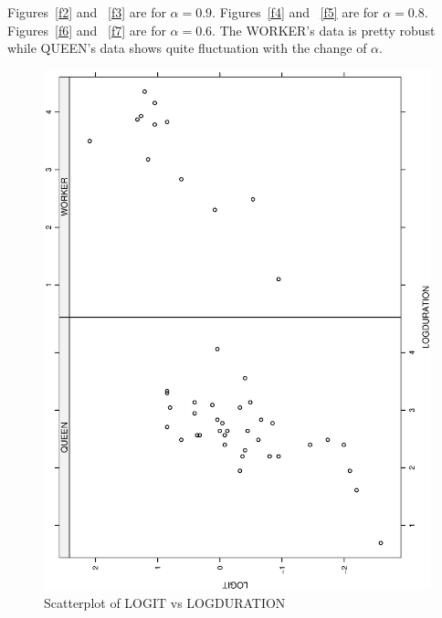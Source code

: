\documentclass[a4paper,10pt]{article}
\begin{document}
Figures~\ref{f2} and ~\ref{f3} are for $\alpha=0.9$. Figures~\ref{f4} and ~\ref{f5} are for $\alpha=0.8$. Figures~\ref{f6} and ~\ref{f7} are for $\alpha=0.6$. The WORKER's data is pretty robust while QUEEN's data shows quite fluctuation with the change of $\alpha$.

\begin{figure}
\includegraphics[angle=-90, width=1\textwidth]{figures/math650_hw8_fig1.eps}
\caption{Scatterplot of LOGIT vs LOGDURATION}\label{f1}
\end{figure}
\end{document}
